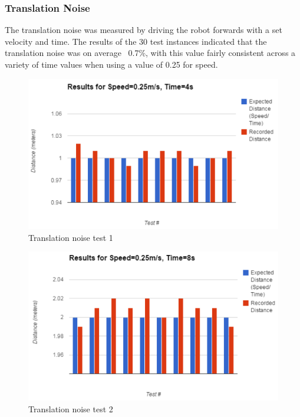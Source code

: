 \documentclass{article}
\begin{document}
\begin{multicols}{2}
	\subsubsection{Translation Noise}
	The translation noise was measured by driving the robot forwards with a set velocity and time. The results of the 30 test instances indicated that the translation noise was on average ~0.7\%, with this value fairly consistent across a variety of time values when using a value of 0.25 for speed.
	\begin{figure}[H]
	\begin{center}
	\includegraphics[width=0.9\linewidth]{ExperimentalResults1}
	\caption{Translation noise test 1}
	\end{center}
	\end{figure}
	\begin{figure}[H]
	\begin{center}
	\includegraphics[width=0.9\linewidth]{ExperimentalResults2}
	\caption{Translation noise test 2}
	\end{center}
	\end{figure}
	\begin{figure}[H]
	\begin{center}

\end{center}
\end{figure}
\end{multicols}
\end{document}
